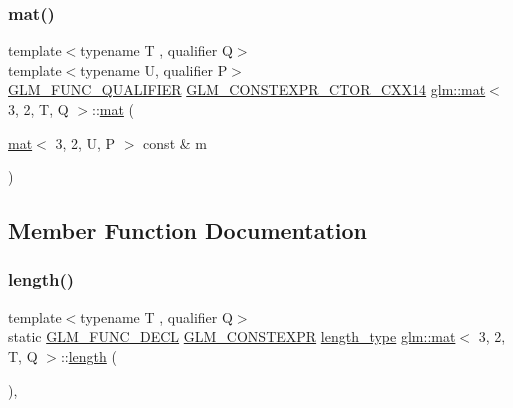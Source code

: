 \mbox{\label{structglm_1_1mat_3_013_00_012_00_01_t_00_01_q_01_4_a35a259f91ad5cca9bab10166d9df9d94}} 
\subsubsection{\texorpdfstring{mat()}{mat()}\hspace{0.1cm}{\footnotesize\ttfamily [21/21]}}
{\footnotesize\ttfamily template$<$typename T , qualifier Q$>$ \\
template$<$typename U, qualifier P$>$ \\
\mbox{\hyperlink{setup_8hpp_a33fdea6f91c5f834105f7415e2a64407}{G\+L\+M\+\_\+\+F\+U\+N\+C\+\_\+\+Q\+U\+A\+L\+I\+F\+I\+ER}} \mbox{\hyperlink{setup_8hpp_a0900f9145e68bf6061b6f5e7be3fa751}{G\+L\+M\+\_\+\+C\+O\+N\+S\+T\+E\+X\+P\+R\+\_\+\+C\+T\+O\+R\+\_\+\+C\+X\+X14}} \mbox{\hyperlink{structglm_1_1mat}{glm\+::mat}}$<$ 3, 2, T, Q $>$\+::\mbox{\hyperlink{structglm_1_1mat}{mat}} (\begin{DoxyParamCaption}\item[{\mbox{\hyperlink{structglm_1_1mat}{mat}}$<$ 3, 2, U, P $>$ const \&}]{m }\end{DoxyParamCaption})}



\subsection{Member Function Documentation}
\mbox{\label{structglm_1_1mat_3_013_00_012_00_01_t_00_01_q_01_4_a0749f456a66fa818e3d8aa4db3eaea3b}} 
\subsubsection{\texorpdfstring{length()}{length()}}
{\footnotesize\ttfamily template$<$typename T , qualifier Q$>$ \\
static \mbox{\hyperlink{setup_8hpp_ab2d052de21a70539923e9bcbf6e83a51}{G\+L\+M\+\_\+\+F\+U\+N\+C\+\_\+\+D\+E\+CL}} \mbox{\hyperlink{setup_8hpp_a08b807947b47031d3a511f03f89645ad}{G\+L\+M\+\_\+\+C\+O\+N\+S\+T\+E\+X\+PR}} \mbox{\hyperlink{structglm_1_1mat_3_013_00_012_00_01_t_00_01_q_01_4_ac2f268fa5e899b2a6ad8139183ed61d4}{length\+\_\+type}} \mbox{\hyperlink{structglm_1_1mat}{glm\+::mat}}$<$ 3, 2, T, Q $>$\+::\mbox{\hyperlink{_s_d_l__opengl__glext_8h_ab9c919755bde3b34349e23a32b4e0fa7}{length}} (\begin{DoxyParamCaption}{ }\end{DoxyParamCaption})\hspace{0.3cm}{\ttfamily [inline]}, {\ttfamily [static]}}

